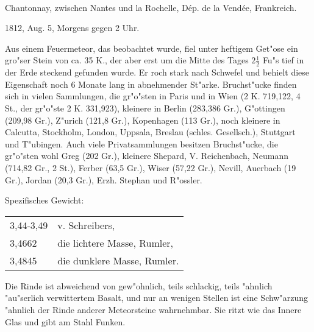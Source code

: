 \documentclass[a4paper, 11pt, oneside]{article}
\begin{document}
\paragraph{}
Chantonnay, zwischen Nantes und la Rochelle, Dép. de la Vendée, Frankreich.

1812, Aug. 5, Morgens gegen 2 Uhr.

Aus einem Feuermeteor, das beobachtet wurde, fiel unter heftigem Get"ose ein gro"ser Stein von ca. 35 K., der aber erst um die Mitte des Tages $\mathfrak{2\frac{1}{2}}$ Fu"s tief in der Erde steckend gefunden wurde. Er roch stark nach Schwefel und behielt diese Eigenschaft noch 6 Monate lang in abnehmender St"arke. Bruchst"ucke finden sich in vielen Sammlungen, die gr"o"sten in Paris und in Wien (2 K. 719,122, 4 St., der gr"o"ste 2 K. 331,923), kleinere in Berlin (283,386 Gr.), G"ottingen (209,98 Gr.), Z"urich (121,8 Gr.), Kopenhagen (113 Gr.), noch kleinere in Calcutta, Stockholm, London, Uppsala, Breslau (schles. Gesellsch.), Stuttgart und T"ubingen. Auch viele Privatsammlungen besitzen Bruchst"ucke, die gr"o"sten wohl Greg (202 Gr.), kleinere Shepard, V. Reichenbach, Neumann (714,82 Gr., 2 St.), Ferber (63,5 Gr.),
Wiser (57,22 Gr.), Nevill, Auerbach (19 Gr.), Jordan (20,3 Gr.), Erzh. Stephan und R"ossler.

Spezifisches Gewicht:
\begin{table}[!ht]
    \centering\swabfamily\Large
    \begin{tabular}{l l}
        3,44-3,49 & v. Schreibers,\\
        3,4662 & die lichtere Masse, Rumler,\\
        3,4845 & die dunklere Masse, Rumler.
    \end{tabular}
\end{table}

Die Rinde ist abweichend von gew"ohnlich, teils schlackig, teils "ahnlich "au"serlich verwittertem Basalt, und nur an wenigen Stellen ist eine Schw"arzung "ahnlich der Rinde anderer Meteorsteine wahrnehmbar. Sie ritzt wie das Innere Glas und gibt am Stahl Funken.
\end{document}
